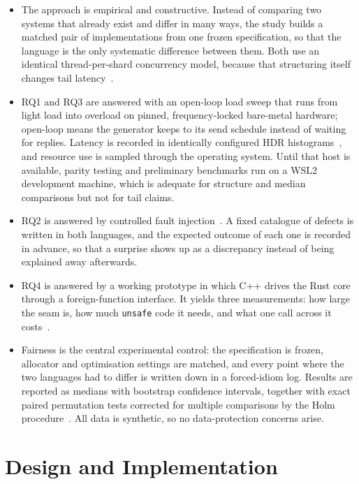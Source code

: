 \documentclass[english,twoside,openright,a4paper,censored,csm,software-track-2020]{HYthesisML}
\begin{document}
\begin{itemize}
  \item The approach is empirical and constructive. Instead of comparing two systems that
        already exist and differ in many ways, the study builds a matched pair of
        implementations from one frozen specification, so that the language is the only
        systematic difference between them. Both use an identical thread-per-shard concurrency
        model, because that structuring itself changes tail
        latency~\cite{enberg2019threadpercore}.
  \item RQ1 and RQ3 are answered with an open-loop load sweep that runs from light load into
        overload on pinned, frequency-locked bare-metal hardware; open-loop means the generator
        keeps to its send schedule instead of waiting for replies. Latency is recorded in
        identically configured HDR histograms~\cite{tene_hdrhistogram}, and resource use is
        sampled through the operating system. Until that host is available, parity testing and
        preliminary benchmarks run on a WSL2 development machine, which is adequate for
        structure and median comparisons but not for tail claims.
  \item RQ2 is answered by controlled fault injection~\cite{natella2016fault}. A fixed
        catalogue of defects is written in both languages, and the expected outcome of each one
        is recorded in advance, so that a surprise shows up as a discrepancy instead of being
        explained away afterwards.
  \item RQ4 is answered by a working prototype in which C++ drives the Rust core through a
        foreign-function interface. It yields three measurements: how large the seam is, how
        much \texttt{unsafe} code it needs, and what one call across it
        costs~\cite{li2022crosslang}.
  \item Fairness is the central experimental control: the specification is frozen, allocator
        and optimisation settings are matched, and every point where the two languages had to
        differ is written down in a forced-idiom log. Results are reported as medians with
        bootstrap confidence intervals, together with exact paired permutation tests corrected
        for multiple comparisons by the Holm procedure~\cite{georges2007rigorous}. All data is
        synthetic, so no data-protection concerns arise.
\end{itemize}

\chapter{Design and Implementation\label{chapter:design}}
\end{document}
